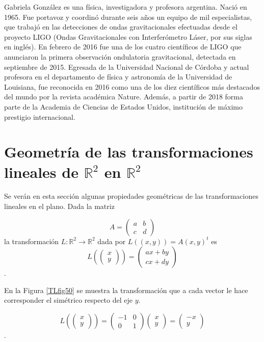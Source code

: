\begin{parchment} {Gabriela González es una física, investigadora y profesora argentina. Nació en 1965. Fue portavoz y coordinó durante seis años un equipo de mil especialistas, que trabajó en las detecciones de ondas gravitacionales efectuadas desde el proyecto LIGO (Ondas Gravitacionales con Interferómetro Láser, por sus siglas en inglés). En febrero de 2016 fue una de los cuatro científicos de LIGO que anunciaron la primera observación ondulatoria gravitacional, detectada en septiembre de 2015. Egresada de la Universidad Nacional de Córdoba y actual profesora en el departamento de física y astronomía de la Universidad de Louisiana, fue reconocida en 2016 como una de los diez científicos más destacados del mundo por la revista académica Nature. Además, a partir de 2018 forma parte de la Academia de Ciencias de Estados Unidos, institución de máximo prestigio internacional.  \cite{GabG} }
\end{parchment}


\bigskip

\section{Geometría de las transformaciones  lineales  de $\mathbb{R}^2$ en  $\mathbb{R}^2$   }
Se verán en esta sección algunas propiedades geométricas de las transformaciones lineales en el plano.
Dada la matriz 

$$A=\left(   \begin{array}{cc} a & b \\ c & d   \end{array} \right )$$
\noindent
la transformación $L: \mathbb{R}^2  \rightarrow \mathbb{R}^2$ dada por $L((x,y))=A (x,y)^t$ es $$L  \left( \left(  \begin{array}{c} x  \\ y  \end{array}    \right) \right )=\left(   \begin{array}{c} a x + by  \\ cx +  d y  \end{array} \right )$$ .
\begin{example}
 En la Figura \ref{TLfig50} se muestra la transformación que a cada vector le hace corresponder el simétrico respecto del eje $y$.

 $$L  \left( \left(  \begin{array}{c} x  \\ y  \end{array}    \right) \right )= \left(   \begin{array}{cc} -1 & 0 \\ 0 & 1   \end{array} \right ) \left( \begin{array}{c} x  \\ y  \end{array} \right )     =\left(   \begin{array}{c} - x   \\ y  \end{array} \right )$$ .
\end{example}


